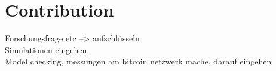 \chapter{Contribution}\label{chap:contribution}
Forschungsfrage etc --> aufschlüsseln\\
Simulationen eingehen\\
Model checking, messungen am bitcoin netzwerk mache, darauf eingehen\\
